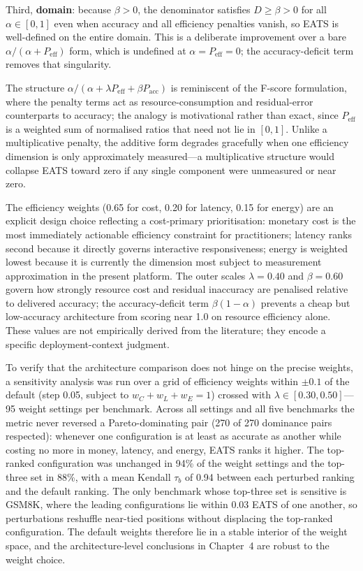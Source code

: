 Third, \textbf{domain}: because $\beta > 0$, the denominator satisfies $D \geq \beta > 0$ for all $\alpha \in [0,1]$ even when accuracy and all efficiency penalties vanish, so EATS is well-defined on the entire domain. This is a deliberate improvement over a bare $\alpha/(\alpha+P_{\text{eff}})$ form, which is undefined at $\alpha = P_{\text{eff}} = 0$; the accuracy-deficit term removes that singularity.

The structure $\alpha/(\alpha + \lambda P_{\text{eff}} + \beta P_{\text{acc}})$ is reminiscent of the F-score formulation, where the penalty terms act as resource-consumption and residual-error counterparts to accuracy; the analogy is motivational rather than exact, since $P_{\text{eff}}$ is a weighted sum of normalised ratios that need not lie in $[0,1]$. Unlike a multiplicative penalty, the additive form degrades gracefully when one efficiency dimension is only approximately measured---a multiplicative structure would collapse EATS toward zero if any single component were unmeasured or near zero.

The efficiency weights (0.65 for cost, 0.20 for latency, 0.15 for energy) are an explicit design choice reflecting a cost-primary prioritisation: monetary cost is the most immediately actionable efficiency constraint for practitioners; latency ranks second because it directly governs interactive responsiveness; energy is weighted lowest because it is currently the dimension most subject to measurement approximation in the present platform. The outer scales $\lambda = 0.40$ and $\beta = 0.60$ govern how strongly resource cost and residual inaccuracy are penalised relative to delivered accuracy; the accuracy-deficit term $\beta(1-\alpha)$ prevents a cheap but low-accuracy architecture from scoring near 1.0 on resource efficiency alone. These values are not empirically derived from the literature; they encode a specific deployment-context judgment.

To verify that the architecture comparison does not hinge on the precise weights, a sensitivity analysis was run over a grid of efficiency weights within $\pm 0.1$ of the default (step 0.05, subject to $w_C + w_L + w_E = 1$) crossed with $\lambda \in [0.30, 0.50]$---95 weight settings per benchmark. Across all settings and all five benchmarks the metric never reversed a Pareto-dominating pair (270 of 270 dominance pairs respected): whenever one configuration is at least as accurate as another while costing no more in money, latency, and energy, EATS ranks it higher. The top-ranked configuration was unchanged in 94\% of the weight settings and the top-three set in 88\%, with a mean Kendall $\tau_b$ of 0.94 between each perturbed ranking and the default ranking. The only benchmark whose top-three set is sensitive is GSM8K, where the leading configurations lie within 0.03 EATS of one another, so perturbations reshuffle near-tied positions without displacing the top-ranked configuration. The default weights therefore lie in a stable interior of the weight space, and the architecture-level conclusions in Chapter~4 are robust to the weight choice.


